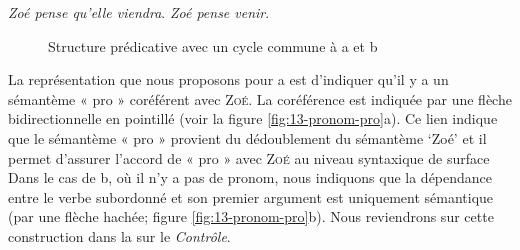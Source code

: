 \ea\label{ex:13-pronom}
\ea \textit{Zoé pense qu’elle viendra}.
\ex \textit{Zoé pense venir}.\z\z

\begin{figure}
\caption{Structure prédicative avec un cycle commune à a et b\label{fig:13-pronom-sem}}
\end{figure}

La représentation que nous proposons pour a est d’indiquer qu’il y a un sémantème « pro » coréférent avec \textsc{Zoé}. La coréférence est indiquée par une flèche bidirectionnelle en pointillé (voir la figure \ref{fig:13-pronom-pro}a). Ce lien indique que le sémantème « pro » provient du dédoublement du sémantème ‘Zoé’ et il permet d’assurer l’accord de « pro » avec \textsc{Zoé} au niveau syntaxique de surface Dans le cas de b, où il n’y a pas de pronom, nous indiquons que la dépendance entre le verbe subordonné et son premier argument est uniquement sémantique (par une flèche hachée; figure \ref{fig:13-pronom-pro}b). Nous reviendrons sur cette construction dans la  sur le \textit{Contrôle}.

